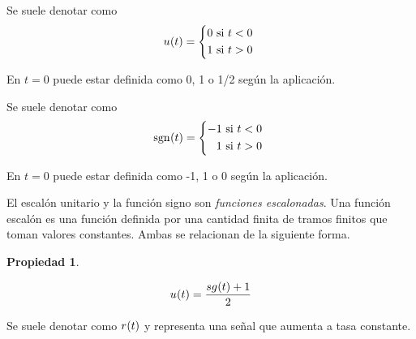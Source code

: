 \documentclass[a5paper,12pt,twoside]{book}
\newtheorem{prop}{{Propiedad}}[chapter]
\begin{document}

Se suele denotar como
\begin{equation*}
    \fx[u]{t} =
    \left\{
    \begin{aligned}
        0 \text{ si $t<0$ }
        \\
        1 \text{ si $t>0$ }
    \end{aligned}
    \right.
\end{equation*}

En $t=0$ puede estar definida como 0, 1 o 1/2 según la aplicación.



Se suele denotar como
\begin{equation*}
    \fx[\sgn]{t} =
    \left\{
    \begin{aligned}
        -1 \text{ si $t<0$ }
        \\
        1 \text{ si $t>0$ }
    \end{aligned}
    \right.
\end{equation*} 

En $t=0$ puede estar definida como -1, 1 o 0 según la aplicación.


El escalón unitario y la función signo son \emph{funciones escalonadas}. Una función escalón es una función definida por una cantidad finita de tramos finitos que toman valores constantes. Ambas se relacionan de la siguiente forma.

\begin{mdframed}[style=MyFrame1]
    \begin{prop}
    \end{prop}
    \begin{equation*}
        \fx[u]{t} = \frac{\fx[sg]{t} + 1}{2}
    \end{equation*}
\end{mdframed}


Se suele denotar como $\fx[r]{t}$ y representa una señal que aumenta a tasa constante.

\end{document}
